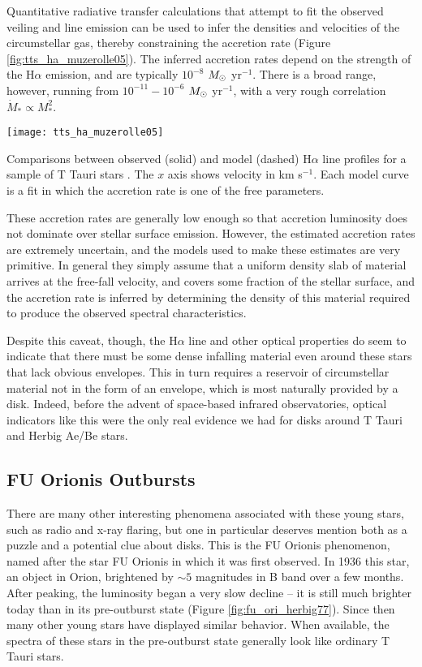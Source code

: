 Quantitative radiative transfer calculations that attempt to fit the observed veiling and line emission can be used to infer the densities and velocities of the circumstellar gas, thereby constraining the accretion rate (Figure \ref{fig:tts_ha_muzerolle05}). The inferred accretion rates depend on the strength of the H$\alpha$ emission, and are typically $10^{-8}$ $M_{\odot}$ yr$^{-1}$. There is a broad range, however, running from $10^{-11}-10^{-6}$ $M_{\odot}$ yr$^{-1}$, with a very rough correlation $\dot{M}_*\propto M_*^2$.

\begin{marginfigure}
\texttt{[image: tts\_ha\_muzerolle05]}
\caption[H$\alpha$ lines from T Tauri stars compared to models]{
\label{fig:tts_ha_muzerolle05}
Comparisons between observed (solid) and model (dashed) H$\alpha$ line profiles for a sample of T Tauri stars \citep{muzerolle05a}. The $x$ axis shows velocity in km s$^{-1}$. Each model curve is a fit in which the accretion rate is one of the free parameters.
}
\end{marginfigure}

These accretion rates are generally low enough so that accretion luminosity does not dominate over stellar surface emission. However, the estimated accretion rates are extremely uncertain, and the models used to make these estimates are very primitive. In general they simply assume that a uniform density slab of material arrives at the free-fall velocity, and covers some fraction of the stellar surface, and the accretion rate is inferred by determining the density of this material required to produce the observed spectral characteristics.

Despite this caveat, though, the H$\alpha$ line and other optical properties do seem to indicate that there must be some dense infalling material even around these stars that lack obvious envelopes. This in turn requires a reservoir of circumstellar material not in the form of an envelope, which is most naturally provided by a disk. Indeed, before the advent of space-based infrared observatories, optical indicators like this were the only real evidence we had for disks around T Tauri and Herbig Ae/Be stars.

\subsection{FU Orionis Outbursts}

There are many other interesting phenomena associated with these young stars, such as radio and x-ray flaring, but one in particular deserves mention both as a puzzle and a potential clue about disks. This is the FU Orionis phenomenon, named after the star FU Orionis in which it was first observed. In 1936 this star, an object in Orion, brightened by $\sim 5$ magnitudes in B band over a few months. After peaking, the luminosity began a very slow decline -- it is still much brighter today than in its pre-outburst state (Figure \ref{fig:fu_ori_herbig77}). Since then many other young stars have displayed similar behavior. When available, the spectra of these stars in the pre-outburst state generally look like ordinary T Tauri stars.


